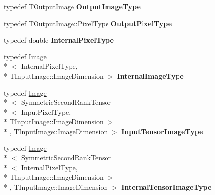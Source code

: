 \begin{DoxyCompactItemize}
\item 
\hypertarget{classitk_1_1_multigrid_anisotropic_diffusion_image_filter_aa81c0f20db5dbf5cf46f3b6e9dc7f569}{typedef T\-Output\-Image {\bfseries Output\-Image\-Type}}\label{classitk_1_1_multigrid_anisotropic_diffusion_image_filter_aa81c0f20db5dbf5cf46f3b6e9dc7f569}

\item 
\hypertarget{classitk_1_1_multigrid_anisotropic_diffusion_image_filter_ad02c604083fd2fce15aa12fa9bf8d7f0}{typedef T\-Output\-Image\-::\-Pixel\-Type {\bfseries Output\-Pixel\-Type}}\label{classitk_1_1_multigrid_anisotropic_diffusion_image_filter_ad02c604083fd2fce15aa12fa9bf8d7f0}

\item 
\hypertarget{classitk_1_1_multigrid_anisotropic_diffusion_image_filter_a9df6a18ac8f39a8a038929943dc90895}{typedef double {\bfseries Internal\-Pixel\-Type}}\label{classitk_1_1_multigrid_anisotropic_diffusion_image_filter_a9df6a18ac8f39a8a038929943dc90895}

\item 
\hypertarget{classitk_1_1_multigrid_anisotropic_diffusion_image_filter_a295ecd99b5dbcde22c6b1188852c074a}{typedef \hyperlink{class_image}{Image}\\*
$<$ Internal\-Pixel\-Type, \\*
T\-Input\-Image\-::\-Image\-Dimension $>$ {\bfseries Internal\-Image\-Type}}\label{classitk_1_1_multigrid_anisotropic_diffusion_image_filter_a295ecd99b5dbcde22c6b1188852c074a}

\item 
\hypertarget{classitk_1_1_multigrid_anisotropic_diffusion_image_filter_aa903243f030c7ccb09f28425cc5078e5}{typedef \hyperlink{class_image}{Image}\\*
$<$ Symmetric\-Second\-Rank\-Tensor\\*
$<$ Input\-Pixel\-Type, \\*
T\-Input\-Image\-::\-Image\-Dimension $>$\\*
, T\-Input\-Image\-::\-Image\-Dimension $>$ {\bfseries Input\-Tensor\-Image\-Type}}\label{classitk_1_1_multigrid_anisotropic_diffusion_image_filter_aa903243f030c7ccb09f28425cc5078e5}

\item 
\hypertarget{classitk_1_1_multigrid_anisotropic_diffusion_image_filter_aa2deb984a182d33b1079d727fc41dc04}{typedef \hyperlink{class_image}{Image}\\*
$<$ Symmetric\-Second\-Rank\-Tensor\\*
$<$ Internal\-Pixel\-Type, \\*
T\-Input\-Image\-::\-Image\-Dimension $>$\\*
, T\-Input\-Image\-::\-Image\-Dimension $>$ {\bfseries Internal\-Tensor\-Image\-Type}}\label{classitk_1_1_multigrid_anisotropic_diffusion_image_filter_aa2deb984a182d33b1079d727fc41dc04}


\end{DoxyCompactItemize}

